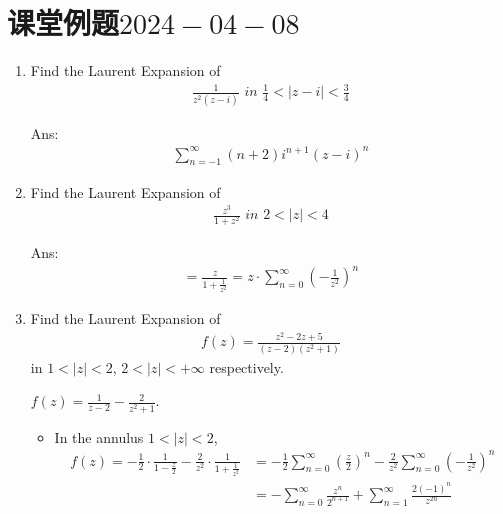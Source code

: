 \newpage

\section{课堂例题$2024-04-08$}
	\begin{enumerate}
		\item Find the Laurent Expansion of 
		\begin{align}
			\frac{1}{z^2 (z - i)} \,\, in \,\, \frac{1}{4} < \left| z - i \right| < \frac{3}{4}
		\end{align}
	
		\begin{solution}
			Ans:
			\begin{align}
				\sum_{n = -1}^{\infty}{(n + 2) i^{n + 1} (z - i)^n}
			\end{align}
		\end{solution}
	
		\vspace{2em}
		
		\item Find the Laurent Expansion of 
		\begin{align}
			\frac{z^3}{1 + z^2} \,\, in \,\, 2 < \left| z \right| < 4
		\end{align}
	
		\begin{solution}
			Ans:
			\begin{align}
				= \frac{z}{1 + \frac{1}{z^2}} = z \cdot \sum_{n = 0}^{\infty}{\left( -\frac{1}{z^2} \right)^n}
			\end{align}
		\end{solution}
	
		\vspace{2em}
		
		\item Find the Laurent Expansion of
		\begin{align}
			f(z) = \frac{z^2 - 2z + 5}{(z - 2)(z^2 + 1)}
		\end{align}
		in $1 < \left| z \right| < 2$, $2 < \left| z \right| < +\infty$ respectively.
		
		\vspace{2em}
		\begin{solution}
			$f(z) = \frac{1}{z - 2} - \frac{2}{z^2 + 1}$.
			\begin{itemize}
				\item In the annulus $1 < \left| z \right| < 2$,
				\begin{align}
					f(z) 
					= -\frac{1}{2} \cdot \frac{1}{1 - \frac{z}{2}} - \frac{2}{z^2} \cdot \frac{1}{1 + \frac{1}{z^2}}
					&= -\frac{1}{2} \sum_{n = 0}^{\infty}{\left( \frac{z}{2} \right)^n} - \frac{2}{z^2} \sum_{n = 0}^{\infty}{\left( -\frac{1}{z^2} \right)^n} \\
					&= -\sum_{n = 0}^{\infty}{\frac{z^n}{2^{n + 1}}} + \sum_{n = 1}^{\infty}{\frac{2(-1)^n}{z^{2n}}}
				\end{align}
				

\end{itemize}
\end{solution}
\end{enumerate}
